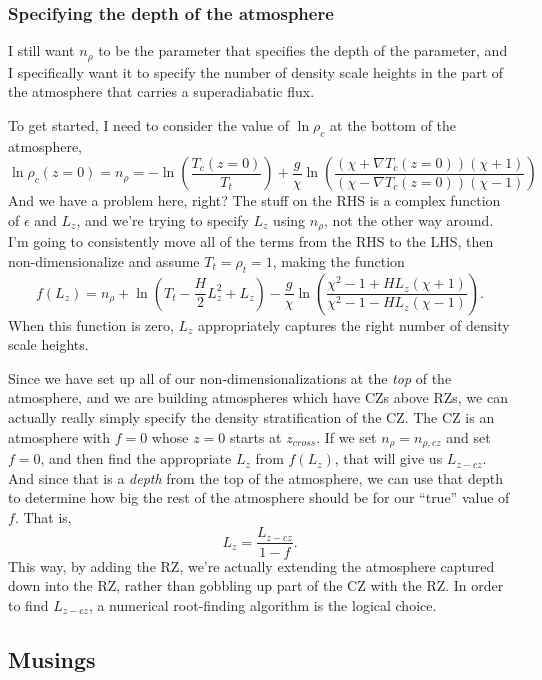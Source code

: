 \documentclass[aps, pre, onecolumn, nofootinbib, notitlepage, groupedaddress, amsfonts, amssymb, amsmath, longbibliography]{revtex4-1}
\newcommand{\grad}{\ensuremath{\nabla}}
\begin{document}
\subsubsection{Specifying the depth of the atmosphere}
I still want $n_\rho$ to be the parameter that specifies the depth of the parameter,
and I specifically want it to specify the number of density scale heights in the part of the
atmosphere that carries a superadiabatic flux.  

To get started, I need to consider the value of $\ln\rho_c$ at the bottom of the atmosphere,
$$
\ln\rho_c(z=0) = n_\rho = -\ln\left(\frac{T_c(z=0)}{T_t}\right)
+ \frac{g}{\chi}\ln\left(\frac{(\chi + \grad T_c(z=0))(\chi + 1)}{(\chi - \grad T_c(z=0))(\chi - 1)}\right)
$$
And we have a problem here, right?  The stuff on the RHS is a complex function of $\epsilon$ and
$L_z$, and we're trying to specify $L_z$ using $n_\rho$, not the other way around.
I'm going to consistently move all of the terms from the RHS to the LHS, then
non-dimensionalize and assume $T_t = \rho_t = 1$, making the function
\begin{equation}
f(L_{z}) = n_\rho + \ln\left(T_t - \frac{H}{2}L_z^2 + L_z\right) - 
\frac{g}{\chi}\ln\left(\frac{\chi^2 - 1 + HL_z(\chi + 1)}{\chi^2 - 1 - HL_z(\chi - 1)}\right).
\end{equation}
When this function is zero, $L_z$ appropriately captures the right number of density scale heights.

Since we have set up all of our non-dimensionalizations at the \emph{top} of the atmosphere, and we
are building atmospheres which have CZs above RZs, we can actually really simply specify the
density stratification of the CZ.  The CZ is an atmosphere with $f = 0$ whose $z = 0$ starts
at $z_{cross}$.  If we set $n_\rho = n_{\rho, cz}$ and set $f = 0$, and then find the appropriate
$L_z$ from $f(L_z)$, that will give us $L_{z-cz}$.  And since that is a \emph{depth} from
the top of the atmosphere, we can use that depth to determine how big the rest of the
atmosphere should be for our ``true'' value of $f$. That is,
\begin{equation}
L_z = \frac{L_{z-cz}}{1 - f}.
\end{equation}
This way, by adding the RZ, we're actually extending the atmosphere captured down into the RZ,
rather than gobbling up part of the CZ with the RZ.  In order to find $L_{z-cz}$, a
numerical root-finding algorithm is the logical choice.

\subsection{Musings}
\end{document}

